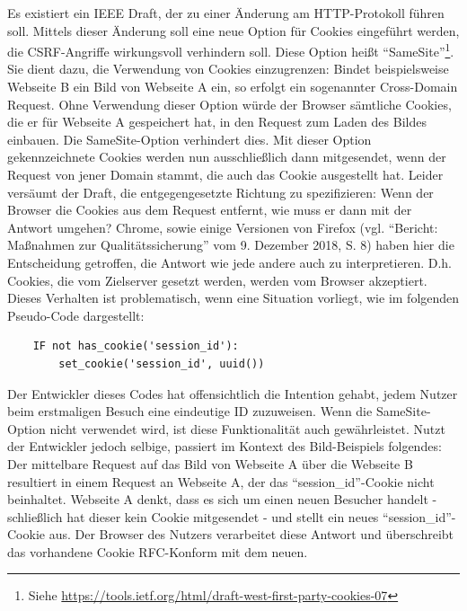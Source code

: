 \documentclass[12pt,DIV14,BCOR10mm,a4paper,parskip=half-,headsepline,headinclude,english,ngerman,bibliography=totocnumbered]{scrreprt}
\begin{document}
Es existiert ein IEEE Draft, der zu einer Änderung am HTTP-Protokoll führen soll. Mittels dieser Änderung soll eine neue Option für Cookies eingeführt werden, die CSRF-Angriffe wirkungsvoll verhindern soll. Diese Option heißt \enquote{SameSite}\footnote{Siehe \url{https://tools.ietf.org/html/draft-west-first-party-cookies-07}}. Sie dient dazu, die Verwendung von Cookies einzugrenzen: Bindet beispielsweise Webseite B ein Bild von Webseite A ein, so erfolgt ein sogenannter Cross-Domain Request. Ohne Verwendung dieser Option würde der Browser sämtliche Cookies, die er für Webseite A gespeichert hat, in den Request zum Laden des Bildes einbauen. Die SameSite-Option verhindert dies. Mit dieser Option gekennzeichnete Cookies werden nun ausschließlich dann mitgesendet, wenn der Request von jener Domain stammt, die auch das Cookie ausgestellt hat.\newline\newline
Leider versäumt der Draft, die entgegengesetzte Richtung zu spezifizieren: Wenn der Browser die Cookies aus dem Request entfernt, wie muss er dann mit der Antwort umgehen? Chrome, sowie einige Versionen von Firefox  (vgl. \enquote{Bericht: Maßnahmen zur Qualitätssicherung} vom 9. Dezember 2018, S. 8) haben hier die Entscheidung getroffen, die Antwort wie jede andere auch zu interpretieren. D.h. Cookies, die vom Zielserver gesetzt werden, werden vom Browser akzeptiert.\newline\newline
Dieses Verhalten ist problematisch, wenn eine Situation vorliegt, wie im folgenden Pseudo-Code dargestellt:
\begin{lstlisting}
	IF not has_cookie('session_id'):
		set_cookie('session_id', uuid())
\end{lstlisting}
Der Entwickler dieses Codes hat offensichtlich die Intention gehabt, jedem Nutzer beim erstmaligen Besuch eine eindeutige ID zuzuweisen. Wenn die SameSite-Option nicht verwendet wird, ist diese Funktionalität auch gewährleistet. Nutzt der Entwickler jedoch selbige, passiert im Kontext des Bild-Beispiels folgendes: Der mittelbare Request auf das Bild von Webseite A über die Webseite B resultiert in einem Request an Webseite A, der das \enquote{session\_id}-Cookie nicht beinhaltet. Webseite A denkt, dass es sich um einen neuen Besucher handelt - schließlich hat dieser kein Cookie mitgesendet - und stellt ein neues \enquote{session\_id}-Cookie aus. Der Browser des Nutzers verarbeitet diese Antwort und überschreibt das vorhandene Cookie RFC-Konform mit dem neuen.\newline\newline
\end{document}
